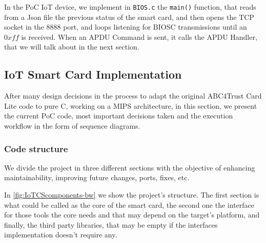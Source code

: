 
\hfil


In the PoC IoT device, we implement in \texttt{BIOS.c} the \texttt{main()} function, that reads from a Json file the previous status of the smart card, and then opens the TCP socket in the $8888$ port, and loops listening for BIOSC transmissions until an $0xff$ is received. When an APDU Command is sent, it calls the APDU Handler, that we will talk about in the next section.




\subsection{IoT Smart Card Implementation}


After many design decisions in the process to adapt the original ABC4Trust Card Lite code to pure C, working on a MIPS architecture, in this section, we present the current \ac{PoC} code, most important decisions taken and the execution workflow in the form of sequence diagrams.


\hfil



\subsubsection{Code structure}


We divide the project in three different sections with the objective of enhancing maintainability, improving future changes, ports, fixes, etc.

In \autoref{fig:IoTCScomponents-bw} we show the project's structure. The first section is what could be called as the core of the smart card, the second one the interface for those tools the core needs and that may depend on the target's platform, and finally, the third party libraries, that may be empty if the interfaces implementation doesn't require any.





